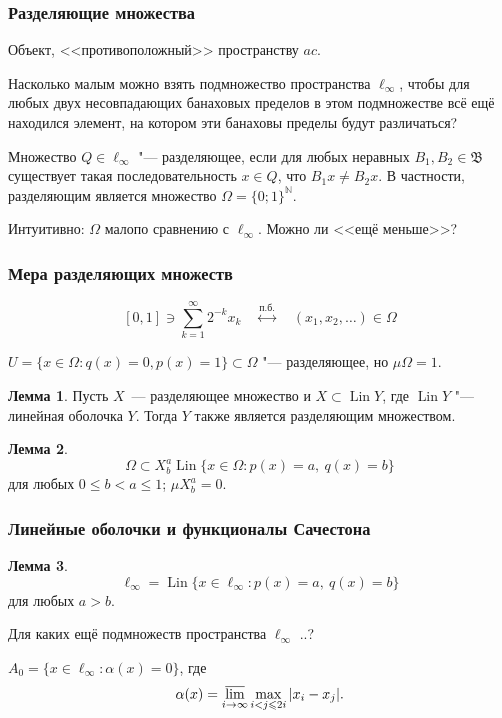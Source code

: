 \documentclass[10pt,pdf,hyperref={unicode},aspectratio=169,color={usenames, dvipsnames}]{beamer}\usepackage{amsmath}
\theoremstyle{definition}
\newtheorem{llemma}{Лемма}
\begin{document}
\begin{frame}\frametitle{Разделяющие множества}
	Объект, <<противоположный>> пространству $ac$.

	Насколько малым можно взять подмножество пространства $\ell_\infty$,
	чтобы для любых двух несовпадающих банаховых пределов в этом подмножестве всё ещё находился элемент,
	на котором эти банаховы пределы будут различаться?

	Множество $Q\in\ell_\infty$ "--- разделяющее, если
	для любых неравных $B_1, B_2\in\mathfrak{B}$ существует такая последовательность $x\in Q$,
	что $B_1 x \neq B_2 x$.
	В частности, разделяющим является множество $\Omega = \{0;1\}^\mathbb{N}$.

	Интуитивно: $\Omega$ малопо сравнению с $\ell_\infty$. Можно ли <<ещё меньше>>?
\end{frame}

\begin{frame}\frametitle{Мера разделяющих множеств}

	\begin{equation}\label{eq:bijection_omega_0_1}
		[0,1] \ni \sum_{k=1}^\infty 2^{-k} x_k
		\quad
		\stackrel{\text{п.б.}}{\leftrightarrow}
		\quad
		(x_1, x_2, \dots)\in \Omega
	\end{equation}

	$U = \{ x\in\Omega: q(x) = 0, p(x) = 1 \} \subset\Omega$ "--- разделяющее,
	но $\mu \Omega = 1$.

	\begin{llemma}
		Пусть $X$~--- разделяющее множество и $X \subset \operatorname{Lin} Y$,
		где $\operatorname{Lin} Y$ "--- линейная оболочка $Y$.
		Тогда $Y$ также является разделяющим множеством.
	\end{llemma}

	\begin{llemma}
		\begin{equation}
			\Omega \subset X_b^a\operatorname{Lin}\{x\in\Omega : p(x) = a,~ q(x) = b\}
		\end{equation}
		для любых $0\leq b < a \leq 1$; $\mu X_b^a = 0$.
	\end{llemma}


\end{frame}

\begin{frame}\frametitle{Линейные оболочки и функционалы Сачестона}

	\begin{llemma}
		\begin{equation}
			\ell_\infty = \operatorname{Lin}\{x\in\ell_\infty : p(x) = a,~ q(x) = b\}
		\end{equation}
		для любых $a>b$.
	\end{llemma}
	\vspace{1em}

	Для каких ещё подмножеств пространства $\ell_\infty$ ..?

	$A_0 = \{ x \in \ell_\infty : \alpha(x) =0 \}$,
	где~\cite{our-vzms-2018}
	\begin{equation*}
		\alpha(x) = \varlimsup_{i\to\infty} \max_{i<j\leqslant 2i} |x_i - x_j|
		.
	\end{equation*}


\end{frame}
\end{document}
